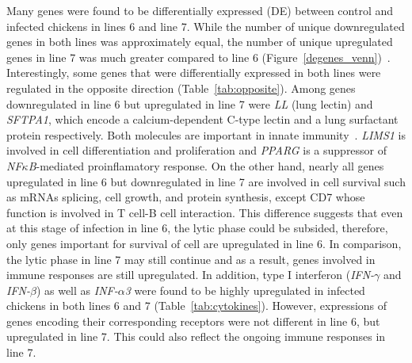 \documentclass[10pt]{article}
\begin{document}
Many genes were found to be differentially expressed (DE) between control and infected
chickens in lines 6 and line 7.
While the number of unique downregulated genes in both lines was approximately equal,
the number of unique upregulated genes in line 7 was much greater compared
to line 6 (Figure~\ref{degenes_venn})~\cite{lee1983ontogeny}.
Interestingly, some genes that were differentially expressed in both lines were
regulated in the opposite direction (Table~\ref{tab:opposite}).
Among genes downregulated in line 6 but upregulated in line 7 were
\textit{LL} (lung lectin) and \textit{SFTPA1}, which encode a calcium-dependent C-type
lectin and a lung surfactant protein respectively.
Both molecules are important in innate immunity~\cite{hogenkamp2008chicken,kingma2006defense}.
\textit{LIMS1} is involved in cell differentiation and proliferation and
\textit{PPARG} is a suppressor of \textit{NF$\kappa$B}-mediated proinflamatory response.
On the other hand, nearly all genes upregulated in line 6 but downregulated in line 7
are involved in cell survival such as mRNAs splicing, cell growth, and protein synthesis,
except CD7 whose function is involved in T cell-B cell interaction.
This difference suggests that even at this stage of infection in line 6, the lytic phase 
could be subsided, therefore, only genes important for survival of cell are upregulated in line 6.
In comparison, the lytic phase in line 7 may still continue and as a result, genes involved in
immune responses are still upregulated.
In addition, type I interferon (\textit{IFN-$\gamma$} and \textit{IFN-$\beta$}) as well as \textit{INF-$\alpha$3} were found to be highly
upregulated in infected chickens in both lines 6 and 7 (Table~\ref{tab:cytokines}).
However, expressions of genes encoding their corresponding receptors
were not different in line 6, but upregulated in line 7.
This could also reflect the ongoing immune responses in line 7.
\end{document}
